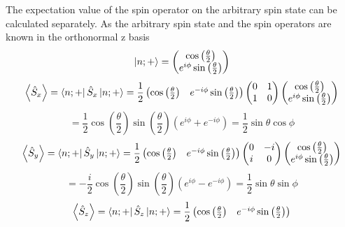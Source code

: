 \begin{sol}
The expectation value of the spin operator on the arbitrary spin state can be calculated separately. As the arbitrary spin state and the spin operators are known in the orthonormal z basis
        \[
            \ket{n;+}=\begin{pmatrix} \cos\left( \frac{\theta}{2} \right) \\e^{i\phi}\sin\left( \frac{\theta}{2} \right)  \end{pmatrix} 
        \] 
        \[
            \left<\hat{S}_x \right> = \bra{n;+}\hat{S}_x\ket{n;+}=\frac{1}{2}\begin{pmatrix} \cos\left( \frac{\theta}{2} \right)&e^{-i\phi}\sin\left( \frac{\theta}{2} \right)   \end{pmatrix} 
            \begin{pmatrix} 0&1\\1&0 \end{pmatrix}
            \begin{pmatrix} \cos\left( \frac{\theta}{2} \right)\\e^{i\phi}\sin\left( \frac{\theta}{2} \right)   \end{pmatrix}     
        \]
        \[
            =\frac{1}{2}\cos\left( \frac{\theta}{2} \right)\sin\left( \frac{\theta}{2} \right)\left(e^{i\phi}+e^{-i\phi}\right)=\frac{1}{2}\sin\theta\cos\phi  
        \]
        \[
            \left<\hat{S}_y \right> = \bra{n;+}\hat{S}_y\ket{n;+}=\frac{1}{2}\begin{pmatrix} \cos\left( \frac{\theta}{2} \right) & e^{-i\phi}\sin\left( \frac{\theta}{2} \right)  \end{pmatrix}
            \begin{pmatrix} 0&-i\\i&0 \end{pmatrix}\begin{pmatrix} \cos\left( \frac{\theta}{2} \right) \\ e^{i\phi}\sin\left( \frac{\theta}{2} \right)  \end{pmatrix}  
        \]     
            \[
                =-\frac{i}{2}\cos\left( \frac{\theta}{2} \right)\sin\left( \frac{\theta}{2} \right)\left( e^{i\phi}-e^{-i\phi} \right)=\frac{1}{2}\sin\theta\sin\phi   
            \] 
        \[
            \left<\hat{S}_z \right> = \bra{n;+}\hat{S}_z\ket{n;+}=\frac{1}{2}\begin{pmatrix} \cos\left( \frac{\theta}{2} \right)& e^{-i\phi}\sin\left( \frac{\theta}{2} \right)  \end{pmatrix} 
\]
\end{sol}

